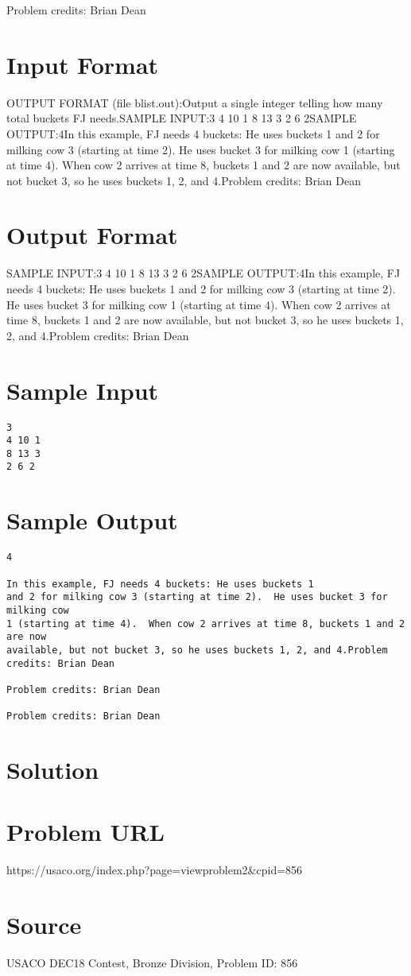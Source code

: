 \documentclass[12pt]{article}
\begin{document}
Problem credits: Brian Dean



\section*{Input Format}
OUTPUT FORMAT (file blist.out):Output a single integer telling how many total buckets FJ needs.SAMPLE INPUT:3
4 10 1
8 13 3
2 6 2SAMPLE OUTPUT:4In this example, FJ needs 4 buckets: He uses buckets 1
and 2 for milking cow 3 (starting at time 2).  He uses bucket 3 for milking cow
1 (starting at time 4).  When cow 2 arrives at time 8, buckets 1 and 2 are now
available, but not bucket 3, so he uses buckets 1, 2, and 4.Problem credits: Brian Dean

\section*{Output Format}
SAMPLE INPUT:3
4 10 1
8 13 3
2 6 2SAMPLE OUTPUT:4In this example, FJ needs 4 buckets: He uses buckets 1
and 2 for milking cow 3 (starting at time 2).  He uses bucket 3 for milking cow
1 (starting at time 4).  When cow 2 arrives at time 8, buckets 1 and 2 are now
available, but not bucket 3, so he uses buckets 1, 2, and 4.Problem credits: Brian Dean

\section*{Sample Input}
\begin{verbatim}
3
4 10 1
8 13 3
2 6 2
\end{verbatim}

\section*{Sample Output}
\begin{verbatim}
4

In this example, FJ needs 4 buckets: He uses buckets 1
and 2 for milking cow 3 (starting at time 2).  He uses bucket 3 for milking cow
1 (starting at time 4).  When cow 2 arrives at time 8, buckets 1 and 2 are now
available, but not bucket 3, so he uses buckets 1, 2, and 4.Problem credits: Brian Dean

Problem credits: Brian Dean

Problem credits: Brian Dean
\end{verbatim}

\section*{Solution}


\section*{Problem URL}
https://usaco.org/index.php?page=viewproblem2&cpid=856

\section*{Source}
USACO DEC18 Contest, Bronze Division, Problem ID: 856
\end{document}
